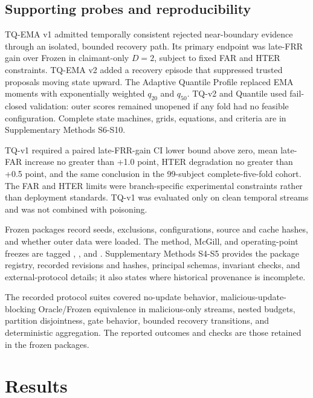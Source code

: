 \documentclass[technologies,article,submit,moreauthors]{Definitions/mdpi}
\begin{document}
\subsection{Supporting probes and reproducibility}\label{sec:supporting-probes-and-reproducibility}

TQ-EMA v1 admitted temporally consistent rejected near-boundary evidence through an isolated, bounded recovery path. Its primary endpoint was late-FRR gain over Frozen in claimant-only \(D=2\), subject to fixed FAR and HTER constraints. TQ-EMA v2 added a recovery episode that suppressed trusted proposals moving state upward. The Adaptive Quantile Profile replaced EMA moments with exponentially weighted \(q_{20}\) and \(q_{50}\). TQ-v2 and Quantile used fail-closed validation: outer scores remained unopened if any fold had no feasible configuration. Complete state machines, grids, equations, and criteria are in Supplementary Methods S6-S10.

TQ-v1 required a paired late-FRR-gain CI lower bound above zero, mean late-FAR increase no greater than +1.0 point, HTER degradation no greater than +0.5 point, and the same conclusion in the 99-subject complete-five-fold cohort. The FAR and HTER limits were branch-specific experimental constraints rather than deployment standards. TQ-v1 was evaluated only on clean temporal streams and was not combined with poisoning.

Frozen packages record seeds, exclusions, configurations, source and cache hashes, and whether outer data were loaded. The method, McGill, and operating-point freezes are tagged \texttt{}, \texttt{}, and \texttt{}. Supplementary Methods S4-S5 provides the package registry, recorded revisions and hashes, principal schemas, invariant checks, and external-protocol details; it also states where historical provenance is incomplete.

The recorded protocol suites covered no-update behavior, malicious-update-blocking Oracle/Frozen equivalence in malicious-only streams, nested budgets, partition disjointness, gate behavior, bounded recovery transitions, and deterministic aggregation. The reported outcomes and checks are those retained in the frozen packages.

\section{Results}\label{sec:results}
\end{document}
